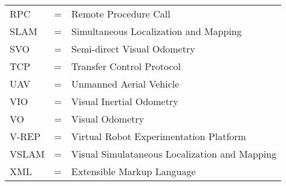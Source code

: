 \begin{center}
\begin{tabular}{ l c l }
    RPC & = & Remote Procedure Call \\
    SLAM & = & Simultaneous Localization and Mapping \\
    SVO & = & Semi-direct Visual Odometry \\
    TCP & = & Transfer Control Protocol \\
    UAV & = & Unmanned Aerial Vehicle \\
    VIO & = & Visual Inertial Odometry \\
    VO & = & Visual Odometry \\
    V-REP & = & Virtual Robot Experimentation Platform \\
    VSLAM & = & Visual Simulataneous Localization and Mapping \\
    XML & = & Extensible Markup Language \\
\end{tabular}
\end{center}

\cleardoublepage

\pagestyle{fancy}
\fancyhf{}
\renewcommand{\chaptermark}[1]{\markboth{\chaptername\ \thechapter.\ #1}{}}
\renewcommand{\sectionmark}[1]{\markright{\thesection\ #1}}
\renewcommand{\headrulewidth}{0.1ex}
\renewcommand{\footrulewidth}{0.1ex}
\fancyfoot[LE,RO]{\thepage}
\fancyhead[LE]{\leftmark}
\fancyhead[RO]{\rightmark}
\fancypagestyle{plain}{\fancyhf{}\fancyfoot[LE,RO]{\thepage}\renewcommand{\headrulewidth}{0ex}}

\setcounter{page}{1}